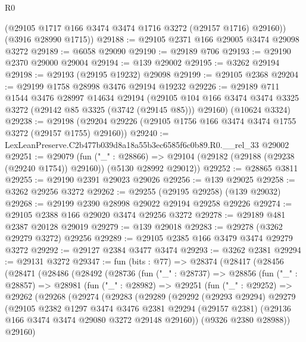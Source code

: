\begin{lexlean}{R0}
\begin{coremodule}
        (@29105 @1717 @166 @3474 @3474 @1716 @3272 (@29157 @1716) @29160))
      (@3916 @28990 @1715))
@29188 := @29105 @2371 @166 @29005 @3474 @29098 @3272
@29189 := @6058 @29090
@29190 := @29189 @706
@29193 := @29190 @2370 @29000 @29004
@29194 := @139 @29002
@29195 := @3262 @29194
@29198 := @29193 (@29195 @19232) @29098
@29199 := @29105 @2368
@29204 := @29199 @1758 @28998 @3476 @29194 @19232
@29226 := @29189
    @711
    @1544
    @3476
    @28997
    @14634
    @29194
    (@29105 @104 @166 @3474 @3474 @3325 @3272 (@29142 @85 @3325 (@3742 (@29145 @85))) @29160)
    (@10624 @3324)
@29238 := @29198 (@29204 @29226 (@29105 @1756 @166 @3474 @3474 @1755 @3272 (@29157 @1755) @29160))
@29240 := LexLeanPreserve.C2b477b039d8a18a55b3ec6585f6c0b89.R0.__rel_33 @29002
@29251 := @29079
    (fun ("_" : @28866) =>
    @29104 (@29182 (@29188 (@29238 (@29240 @1754)) @29160)) (@5130 @28992 @29012))
@29252 := @28865 @3811
@29255 := @29190 @2391 @29023 @29026
@29256 := @139 @29025
@29258 := @3262 @29256 @3272
@29262 := @29255 (@29195 @29258) (@139 @29032)
@29268 := @29199 @2390 @28998 @29022 @29194 @29258 @29226
@29274 := @29105 @2388 @166 @29020 @3474 @29256 @3272
@29278 := @29189 @481 @2387 @20128 @29019
@29279 := @139 @29018
@29283 := @29278 (@3262 @29279 @3272) @29256
@29289 := @29105 @2385 @166 @3479 @3474 @29279 @3272
@29292 := @29127 @2384 @3477 @3474
@29293 := @3262 @2381
@29294 := @29131 @3272
@29347 := fun (bits : @77) =>
  @28374
    (@28417
      (@28456
        (@28471
          (@28486
            (@28492
              (@28736
                (fun ("_" : @28737) =>
                @28856
                  (fun ("_" : @28857) =>
                  @28981
                    (fun ("_" : @28982) =>
                    @29251
                      (fun ("_" : @29252) =>
                      @29262
                        (@29268
                          (@29274
                            (@29283
                              (@29289
                                (@29292
                                  (@29293 @29294)
                                  @29279
                                  (@29105
                                    @2382
                                    @1297
                                    @3474
                                    @3476
                                    @2381
                                    @29294
                                    (@29157 @2381)
                                    (@29136 @166 @3474 @3474 @29080 @3272 @29148 @29160))
                                  (@9326 @2380 @28988))
                                @29160)

\end{coremodule}
\end{lexlean}

